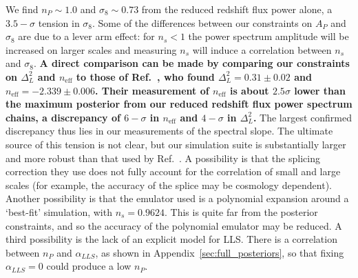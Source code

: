 We find $n_P \sim 1.0$ and $\sigma_8 \sim 0.73$ from the reduced redshift flux power alone, a $3.5-\sigma$ tension in $\sigma_8$. Some of the differences between our constraints on $A_P$ and $\sigma_8$ are due to a lever arm effect: for $n_s < 1$ the power spectrum amplitude will be increased on larger scales and measuring $n_s$ will induce a correlation between $n_s$ and $\sigma_8$. \textbf{A direct comparison can be made by comparing our constraints on $\Delta_L^2$ and $n_\mathrm{eff}$ to those of Ref.~\cite{2019JCAP...07..017C}, who found $\Delta_L^2 = 0.31 \pm 0.02$ and $n_\mathrm{eff} = -2.339 \pm 0.006$. Their measurement of $n_\mathrm{eff}$ is about $2.5\sigma$ lower than the maximum posterior from our reduced redshift flux power spectrum chains, a discrepancy of $6-\sigma$ in $n_\mathrm{eff}$ and $4-\sigma$ in $\Delta_L^2$.}
The largest confirmed discrepancy thus lies in our measurements of the spectral slope. The ultimate source of this tension is not clear, but our simulation suite is substantially larger and more robust than that used by Ref.~\cite{2020JCAP...04..038P}. A possibility is that the splicing correction they use does not fully account for the correlation of small and large scales (for example, the accuracy of the splice may be cosmology dependent). Another possibility is that the emulator used is a polynomial expansion around a `best-fit' simulation, with $n_s = 0.9624$. This is quite far from the posterior constraints, and so the accuracy of the polynomial emulator may be reduced. A third possibility is the lack of an explicit model for LLS. There is a correlation between $n_P$ and $\alpha_{LLS}$, as shown in Appendix~\ref{sec:full_posteriors}, so that fixing $\alpha_{LLS} = 0$ could produce a low $n_P$.



